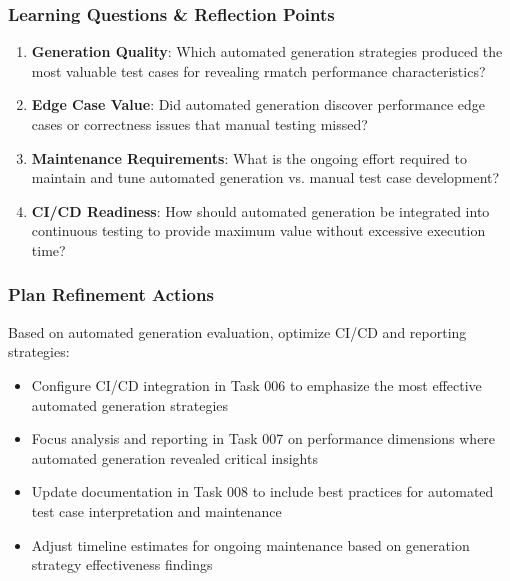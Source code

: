 \documentclass[11pt,a4paper]{article}
\begin{document}
\subsubsection{Learning Questions \& Reflection Points}
\begin{enumerate}
    \item \textbf{Generation Quality}: Which automated generation strategies produced the most valuable test cases for revealing rmatch performance characteristics?
    \item \textbf{Edge Case Value}: Did automated generation discover performance edge cases or correctness issues that manual testing missed?
    \item \textbf{Maintenance Requirements}: What is the ongoing effort required to maintain and tune automated generation vs. manual test case development?
    \item \textbf{CI/CD Readiness}: How should automated generation be integrated into continuous testing to provide maximum value without excessive execution time?
\end{enumerate}

\subsubsection{Plan Refinement Actions}
Based on automated generation evaluation, optimize CI/CD and reporting strategies:
\begin{itemize}
    \item Configure CI/CD integration in Task 006 to emphasize the most effective automated generation strategies
    \item Focus analysis and reporting in Task 007 on performance dimensions where automated generation revealed critical insights
    \item Update documentation in Task 008 to include best practices for automated test case interpretation and maintenance
    \item Adjust timeline estimates for ongoing maintenance based on generation strategy effectiveness findings
\end{itemize}

\end{document}
